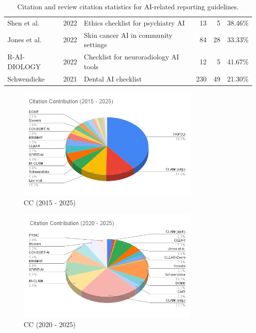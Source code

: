 \documentclass{article}
\begin{document}
\begin{table}[htbp]
{\begin{tabular}{p{3cm} p{1.5cm} p{6cm} r r r}
Shen et al. & 2022 & Ethics checklist for psychiatry AI & 13 & 5 & 38.46\% \\
Jones et al. & 2022 & Skin cancer AI in community settings & 84 & 28 & 33.33\% \\
R-AI-DIOLOGY & 2022 & Checklist for neuroradiology AI tools & 12 & 5 & 41.67\% \\
Schwendicke & 2021 & Dental AI checklist & 230 & 49 & 21.30\% \\
\hline
\end{tabular}
}
\caption{Citation and review citation statistics for AI-related reporting guidelines.}
\label{tab:guidelines_citations}
\end{table}

\newpage

\begin{figure}[htbp]
    \centering
    \includegraphics[width=0.8\textwidth]{Citation Contribution (2015 - 2025).png}
    \caption{CC (2015 - 2025)}
    \label{fig:cc2015}
\end{figure}

\begin{figure}[htbp]
    \centering
    \includegraphics[width=0.8\textwidth]{Citation Contribution (2020 - 2025).png}
    \caption{CC (2020 - 2025)}
    \label{fig:cc2020}
\end{figure}
\end{document}
